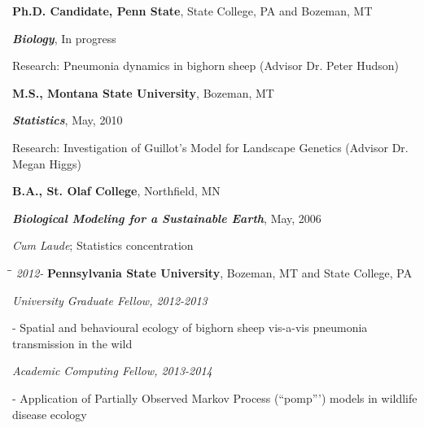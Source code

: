 \documentclass[9pt]{article}
\newenvironment{outerlist}[1][\enskip\textbullet]%
        {\begin{itemize}[#1]}{\end{itemize}%
         }
\newenvironment{innerlist}[1][\enskip\textbullet]%
        {\begin{compactitem}[#1]}{\end{compactitem}}
\begin{document}
\begin{outerlist}
  \item[] \textbf{Ph.D. Candidate, Penn State}, State College, PA and Bozeman, MT 
        \begin{innerlist}
        \item[] \textbf{\textit{Biology}}, In progress 
        \item[] Research: Pneumonia dynamics in bighorn sheep (Advisor Dr. Peter Hudson)
        \end{innerlist}

\item[] \textbf{M.S., Montana State University}, Bozeman, MT 
        \begin{innerlist}
        \item[] \textbf{\textit{Statistics}},  May, 2010
        \item[] Research: Investigation of Guillot's Model for Landscape Genetics (Advisor Dr. Megan Higgs)

        \end{innerlist}

\item[] \textbf{B.A., St. Olaf College}, Northfield, MN
        \begin{innerlist}
        \item[] \textbf{\textit{Biological Modeling for a Sustainable Earth}}, May, 2006
        \item[] \emph{Cum Laude}; Statistics concentration 
        \end{innerlist}
\end{outerlist}



\vspace{.15in}
\begin{tabbing}
\hspace*{.25cm}\=\hspace*{.25cm}\= \kill
\hspace{-1.5cm}\footnotesize{\textit{2012- }} \> \textbf{Pennsylvania State University}, 
Bozeman, MT and State College, PA
\end{tabbing}
\begin{outerlist}
  \item[] \textit{University Graduate Fellow, 2012-2013} 
		\begin{innerlist}
						\vspace{.05in}
			\item[-] Spatial and behavioural ecology of bighorn sheep vis-a-vis pneumonia transmission in the wild
		\end{innerlist}
\vspace{.05in}

  \item[] \textit{Academic Computing Fellow, 2013-2014}
		\begin{innerlist}
						\vspace{.05in}
			\item[-] Application of Partially Observed Markov
				Process (``pomp''') models in wildlife disease
				ecology
		\end{innerlist}
	\end{outerlist}
  
\end{document}
